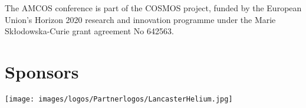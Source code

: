 \begin{center}
The AMCOS conference is part of the COSMOS project, funded by the European Union’s Horizon 2020 research and innovation programme under the Marie Sk\l{}odowska-Curie grant agreement No 642563.
\end{center}

\vfill

\section{Sponsors}

\begin{center}
\texttt{[image: images/logos/Partnerlogos/LancasterHelium.jpg]}
\end{center}

\vfill
